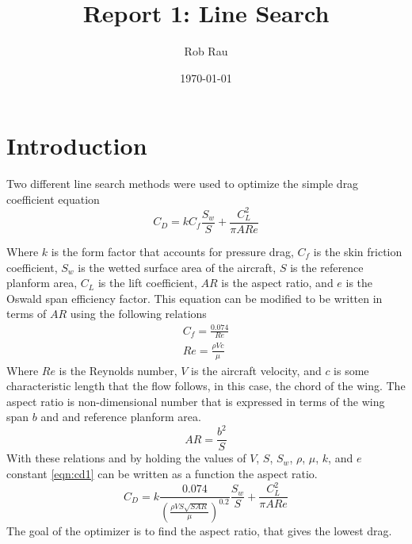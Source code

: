 \documentclass[12pt,parskip=full]{article}
\numberwithin{subsection}{section}
\begin{document}
	\vspace{-2ex}
	\title{Report 1: Line Search\vspace{-3.5ex}}
	\author{Rob Rau\vspace{-4ex}}
	\date{\today\vspace{-4ex}}
	\maketitle
	
	
	\section{Introduction}
	
		Two different line search methods were used to optimize the simple drag coefficient equation
		\begin{equation}\label{eqn:cd1}
			C_D = kC_f \frac{S_w}{S} + \frac{C_{L}^2}{\pi AR e}
		\end{equation}

		Where $k$ is the form factor that accounts for pressure drag, $C_f$ is the skin friction coefficient, $S_w$ is the wetted surface
		area of the aircraft, $S$ is the reference planform area, $C_L$ is the lift coefficient, $AR$ is the aspect ratio, and $e$ is the
		Oswald span efficiency factor. This equation can be modified to be written in terms of $AR$ using the following relations
		\begin{eqnarray}
			C_f = \frac{0.074}{Re} \\
			Re = \frac{\rho V c}{\mu}
		\end{eqnarray}
		Where $Re$ is the Reynolds number, $V$ is the aircraft velocity, and $c$ is some characteristic length that the flow follows, in
		this case, the chord of the wing. The aspect ratio is non-dimensional number that is expressed in terms of the wing span $b$ and
		and reference planform area.
		\begin{equation}
			AR = \frac{b^2}{S}
		\end{equation}
		With these relations and by holding the values of $V$, $S$, $S_w$, $\rho$, $\mu$, $k$, and $e$ constant \cref{eqn:cd1} can be
		written as a function the aspect ratio.
		\begin{equation}
			C_D = k \frac{0.074}{\left(\frac{\rho V S \sqrt{S AR}}{\mu} \right)^{0.2}} \frac{S_w}{S} + \frac{C_{L}^2}{\pi AR e}
		\end{equation}
		The goal of the optimizer is to find the aspect ratio, that gives the lowest drag.
\end{document}
